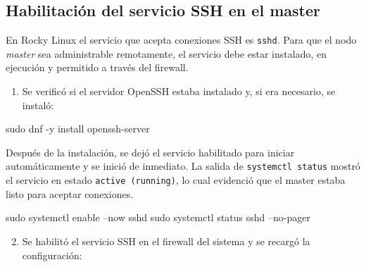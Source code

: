\subsection{Habilitación del servicio SSH en el master}
En Rocky Linux el servicio que acepta conexiones SSH es \texttt{sshd}. Para que el nodo \textit{master} sea administrable remotamente, el servicio debe estar instalado, en ejecución y permitido a través del firewall. \cite{openssh_sshd_config_man,rhel_openssh_secure}

\begin{enumerate}
  \item Se verificó si el servidor OpenSSH estaba instalado y, si era necesario, se instaló:
\end{enumerate}

\begin{terminalblock}
sudo dnf -y install openssh-server
\end{terminalblock}


Después de la instalación, se dejó el servicio habilitado para iniciar automáticamente y se inició de inmediato. La salida de \texttt{systemctl status} mostró el servicio en estado \texttt{active (running)}, lo cual evidenció que el master estaba listo para aceptar conexiones. \cite{rhel_openssh_secure}

\begin{terminalblock}
sudo systemctl enable --now sshd
sudo systemctl status sshd --no-pager
\end{terminalblock}


\begin{enumerate}
  \setcounter{enumi}{1}
  \item Se habilitó el servicio SSH en el firewall del sistema y se recargó la configuración:
\end{enumerate}

